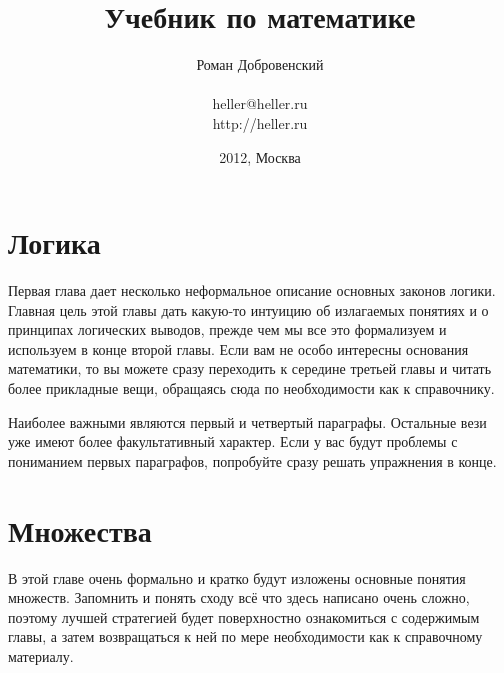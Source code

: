 \documentclass[a5paper,10pt,pagesize,DIV=classic]{scrbook}
\begin{document}
\title{Учебник по математике}
\author{Роман Добровенский\\ \\heller@heller.ru\\http://heller.ru}
\date{2012, Москва}
\maketitle

\tableofcontents



\chapter{Логика}
Первая глава дает несколько неформальное описание основных законов логики. Главная цель этой главы дать какую-то интуицию об излагаемых понятиях и о принципах логических выводов, прежде чем мы все это формализуем и используем в конце второй главы. Если вам не особо интересны основания математики, то вы можете сразу переходить к середине третьей главы и читать более прикладные вещи, обращаясь сюда по необходимости как к справочнику.

Наиболее важными являются первый и четвертый параграфы. Остальные вези уже имеют более факультативный характер. Если у вас будут проблемы с пониманием первых параграфов, попробуйте сразу решать упражнения в конце.











\chapter{Множества}
В этой главе очень формально и кратко будут изложены основные понятия множеств. Запомнить и понять сходу всё что здесь написано очень сложно, поэтому лучшей стратегией будет поверхностно ознакомиться с содержимым главы, а затем возвращаться к ней по мере необходимости как к справочному материалу.





\end{document}
